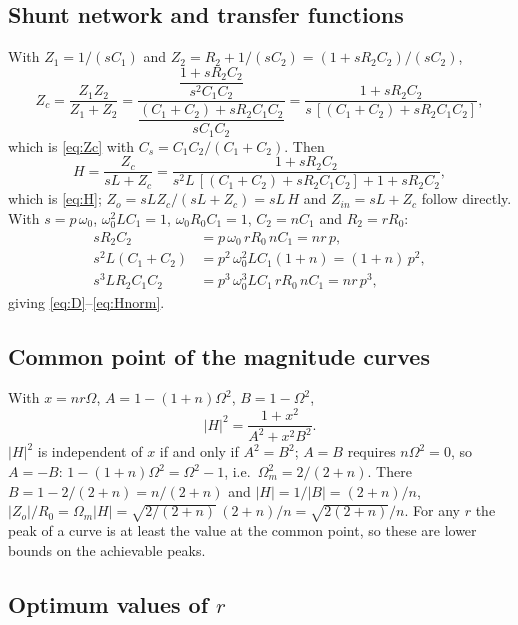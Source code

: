 \documentclass[11pt,a4paper]{article}
\begin{document}
\subsection{Shunt network and transfer functions}

With $Z_1 = 1/(sC_1)$ and $Z_2 = R_2 + 1/(sC_2) = (1 + sR_2C_2)/(sC_2)$,
\begin{equation}
Z_c = \frac{Z_1 Z_2}{Z_1 + Z_2}
    = \frac{\dfrac{1 + sR_2C_2}{s^2 C_1 C_2}}{\dfrac{(C_1 + C_2) + sR_2C_1C_2}{sC_1C_2}}
    = \frac{1 + sR_2C_2}{s\,[(C_1+C_2) + sR_2C_1C_2]},
\end{equation}
which is \eqref{eq:Zc} with $C_s = C_1C_2/(C_1+C_2)$. Then
\begin{equation}
H = \frac{Z_c}{sL + Z_c}
  = \frac{1 + sR_2C_2}{s^2 L\,[(C_1+C_2) + sR_2C_1C_2] + 1 + sR_2C_2},
\end{equation}
which is \eqref{eq:H}; $Z_o = sL Z_c/(sL + Z_c) = sL\,H$ and $Z_{in} = sL + Z_c$ follow
directly. With $s = p\,\omega_0$, $\omega_0^2 L C_1 = 1$, $\omega_0 R_0 C_1 = 1$,
$C_2 = nC_1$ and $R_2 = rR_0$:
\begin{align}
sR_2C_2 &= p\,\omega_0\, r R_0\, n C_1 = n r\, p, \\
s^2 L (C_1 + C_2) &= p^2\,\omega_0^2 L C_1 (1+n) = (1+n)\,p^2, \\
s^3 L R_2 C_1 C_2 &= p^3\,\omega_0^3 L C_1\, r R_0\, n C_1 = n r\, p^3 ,
\end{align}
giving \eqref{eq:D}--\eqref{eq:Hnorm}.

\subsection{Common point of the magnitude curves}

With $x = nr\Omega$, $A = 1 - (1+n)\Omega^2$, $B = 1 - \Omega^2$,
\begin{equation}
|H|^2 = \frac{1 + x^2}{A^2 + x^2 B^2}.
\end{equation}
$|H|^2$ is independent of $x$ if and only if $A^2 = B^2$; $A = B$ requires $n\Omega^2 = 0$,
so $A = -B$: $1 - (1+n)\Omega^2 = \Omega^2 - 1$, i.e.\ $\Omega_m^2 = 2/(2+n)$. There
$B = 1 - 2/(2+n) = n/(2+n)$ and $|H| = 1/|B| = (2+n)/n$, $|Z_o|/R_0 = \Omega_m |H| =
\sqrt{2/(2+n)}\,(2+n)/n = \sqrt{2(2+n)}/n$. For any $r$ the peak of a curve is at least
the value at the common point, so these are lower bounds on the achievable peaks.

\subsection{Optimum values of \texorpdfstring{$r$}{r}}
\end{document}
